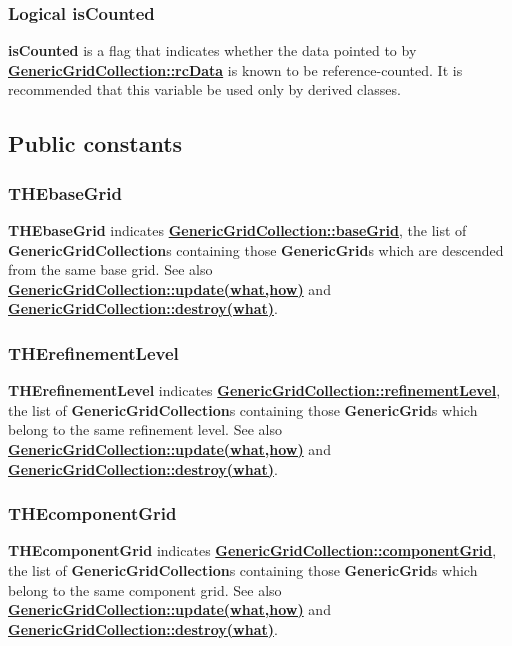 \documentclass{article}
\begin{document}
  \subsubsection{Logical isCounted}
  \label{GenericGridCollection::isCounted}
    \textbf{isCounted} is
    a flag that indicates whether the data pointed to by {\bf{}\hyperref{rcData}{rcData \rm(\S}{)}{GenericGridCollection::rcData}}
    is known to be reference-counted.
    It is recommended that this variable be used only by derived classes.

\subsection{Public constants}
\label{GenericGridCollection::PublicConstants}

  \subsubsection{THEbaseGrid}
  \label{GenericGridCollection::THEbaseGrid}
    \textbf{THEbaseGrid} indicates {\bf{}\hyperref{baseGrid}{baseGrid \rm(\S}{)}{GenericGridCollection::baseGrid}},
    the list of \textbf{GenericGridCollection}s containing those \textbf{GenericGrid}s which are descended from the same base grid.
    See also {\bf{}\hyperref{update(what,how)}{update(what,how) \rm(\S}{)}{GenericGridCollection::update(what,how)}}
    and {\bf{}\hyperref{destroy(what)}{destroy(what) \rm(\S}{)}{GenericGridCollection::destroy(what)}}.

  \subsubsection{THErefinementLevel}
  \label{GenericGridCollection::THErefinementLevel}
    \textbf{THErefinementLevel} indicates {\bf{}\hyperref{refinementLevel}{refinementLevel \rm(\S}{)}{GenericGridCollection::refinementLevel}},
    the list of \textbf{GenericGridCollection}s containing those \textbf{GenericGrid}s which belong to the same refinement level.
    See also {\bf{}\hyperref{update(what,how)}{update(what,how) \rm(\S}{)}{GenericGridCollection::update(what,how)}}
    and {\bf{}\hyperref{destroy(what)}{destroy(what) \rm(\S}{)}{GenericGridCollection::destroy(what)}}.

  \subsubsection{THEcomponentGrid}
  \label{GenericGridCollection::THEcomponentGrid}
    \textbf{THEcomponentGrid} indicates {\bf{}\hyperref{componentGrid}{multigridLevel \rm(\S}{)}{GenericGridCollection::componentGrid}},
    the list of \textbf{GenericGridCollection}s containing those \textbf{GenericGrid}s which belong to the same component grid.
    See also {\bf{}\hyperref{update(what,how)}{update(what,how) \rm(\S}{)}{GenericGridCollection::update(what,how)}}
    and {\bf{}\hyperref{destroy(what)}{destroy(what) \rm(\S}{)}{GenericGridCollection::destroy(what)}}.
\end{document}
